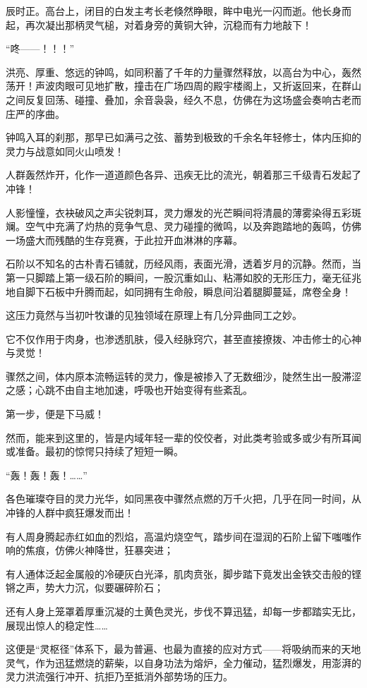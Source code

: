 \vspace{2em}

辰时正。高台上，闭目的白发主考长老倏然睁眼，眸中电光一闪而逝。他长身而起，再次凝出那柄灵气槌，对着身旁的黄铜大钟，沉稳而有力地敲下！

“咚——！！！”

洪亮、厚重、悠远的钟鸣，如同积蓄了千年的力量骤然释放，以高台为中心，轰然荡开！声波肉眼可见地扩散，撞击在广场四周的殿宇楼阁上，又折返回来，在群山之间反复回荡、碰撞、叠加，余音袅袅，经久不息，仿佛在为这场盛会奏响古老而庄严的序曲。

钟鸣入耳的刹那，那早已如满弓之弦、蓄势到极致的千余名年轻修士，体内压抑的灵力与战意如同火山喷发！

人群轰然炸开，化作一道道颜色各异、迅疾无比的流光，朝着那三千级青石发起了冲锋！

人影憧憧，衣袂破风之声尖锐刺耳，灵力爆发的光芒瞬间将清晨的薄雾染得五彩斑斓。空气中充满了灼热的竞争气息、灵力碰撞的微鸣，以及奔跑踏地的轰鸣，仿佛一场盛大而残酷的生存竞赛，于此拉开血淋淋的序幕。

石阶以不知名的古朴青石铺就，历经风雨，表面光滑，透着岁月的沉静。然而，当第一只脚踏上第一级石阶的瞬间，一股沉重如山、粘滞如胶的无形压力，毫无征兆地自脚下石板中升腾而起，如同拥有生命般，瞬息间沿着腿脚蔓延，席卷全身！

这压力竟然与当初叶牧谦的见独领域在原理上有几分异曲同工之妙。

它不仅作用于肉身，也渗透肌肤，侵入经脉窍穴，甚至直接撩拨、冲击修士的心神与灵觉！

骤然之间，体内原本流畅运转的灵力，像是被掺入了无数细沙，陡然生出一股滞涩之感；心跳不由自主地加速，呼吸也开始变得有些紊乱。

第一步，便是下马威！

然而，能来到这里的，皆是内域年轻一辈的佼佼者，对此类考验或多或少有所耳闻或准备。最初的惊愕只持续了短短一瞬。

“轰！轰！轰！……”

各色璀璨夺目的灵力光华，如同黑夜中骤然点燃的万千火把，几乎在同一时间，从冲锋的人群中疯狂爆发而出！

有人周身腾起赤红如血的烈焰，高温灼烧空气，踏步间在湿润的石阶上留下嗤嗤作响的焦痕，仿佛火神降世，狂暴突进；

有人通体泛起金属般的冷硬灰白光泽，肌肉贲张，脚步踏下竟发出金铁交击般的铿锵之声，势大力沉，似要碾碎阶石；

还有人身上笼罩着厚重沉凝的土黄色灵光，步伐不算迅猛，却每一步都踏实无比，展现出惊人的稳定性……

这便是“灵枢径”体系下，最为普遍、也最为直接的应对方式——将吸纳而来的天地灵气，作为迅猛燃烧的薪柴，以自身功法为熔炉，全力催动，猛烈爆发，用澎湃的灵力洪流强行冲开、抗拒乃至抵消外部势场的压力。


